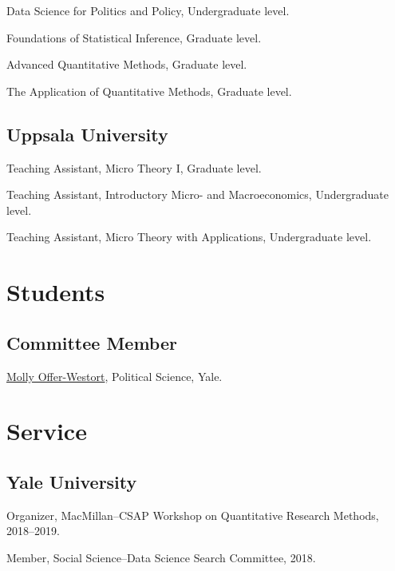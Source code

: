 \documentclass[10pt,letterpaper]{article}
\newenvironment{datelist}{
	\begin{list}{}{
		\setlength{\parskip}{0pt}
		\setlength{\itemsep}{4pt}
		\setlength{\parsep}{0.3em}
		\setlength{\leftmargin}{6em}
		\setlength{\labelwidth}{6em}
		\setlength{\labelsep}{1.5em}
		}
	}{
\end{list}
}
\newenvironment{singledatelist}{
	\begin{list}{}{
		\setlength{\parskip}{0pt}
		\setlength{\itemsep}{4pt}
		\setlength{\parsep}{0.3em}
		\setlength{\leftmargin}{5em}
		\setlength{\labelwidth}{6em}
		\setlength{\labelsep}{1.5em}
		}
	}{
\end{list}
}
\newcommand{\dateitem}[2][]{\item[{#1}] {#2}}
\newenvironment{infolist}{
	\begin{list}{}{
		\setlength{\parskip}{0pt}
		\setlength{\itemsep}{4pt}
		\setlength{\parsep}{0.3em}
		\setlength{\leftmargin}{1.6em}
		\setlength{\labelwidth}{0pt}
		}
	}{
\end{list}
}
\newcommand{\infoitem}[1]{\item {#1}}
\begin{document}
	\begin{datelist}
		\dateitem[2018--2019]{Data Science for Politics and Policy, Undergraduate level.}
		\dateitem[2019]{Foundations of Statistical Inference, Graduate level.}
		\dateitem[2017--2018]{Advanced Quantitative Methods, Graduate level.}
		\dateitem[2018]{The Application of Quantitative Methods, Graduate level.}
	\end{datelist}

	\subsection*{Uppsala University}

	\begin{datelist}
		\dateitem[2011--2012]{Teaching Assistant, Micro Theory I, Graduate level.}
		\dateitem[2011--2012]{Teaching Assistant, Introductory Micro- and Macroeconomics, Undergraduate level.}
		\dateitem[2011]{Teaching Assistant, Micro Theory with Applications, Undergraduate level.}
	\end{datelist}


	\section*{Students}

	\subsection*{Committee Member}

	\begin{singledatelist}
		\dateitem[Current]{\href{https://mollyow.github.io}{Molly Offer-Westort}, Political Science, Yale.}
	\end{singledatelist}


	\section*{Service}

	\subsection*{Yale University}

	\begin{infolist}
		\infoitem{Organizer, MacMillan--CSAP Workshop on Quantitative Research Methods, 2018--2019.}
		\infoitem{Member, Social Science--Data Science Search Committee, 2018.}
	\end{infolist}
\end{document}

